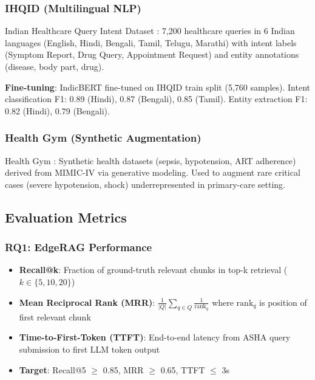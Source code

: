 \documentclass[conference,compsoc]{IEEEtran}
\begin{document}
\subsubsection{IHQID (Multilingual NLP)}
Indian Healthcare Query Intent Dataset \cite{ihqid_acl_2023}: 7,200 healthcare queries in 6 Indian languages (English, Hindi, Bengali, Tamil, Telugu, Marathi) with intent labels (Symptom Report, Drug Query, Appointment Request) and entity annotations (disease, body part, drug).

\textbf{Fine-tuning}: IndicBERT fine-tuned on IHQID train split (5,760 samples). Intent classification F1: 0.89 (Hindi), 0.87 (Bengali), 0.85 (Tamil). Entity extraction F1: 0.82 (Hindi), 0.79 (Bengali).

\subsubsection{Health Gym (Synthetic Augmentation)}
Health Gym \cite{health_gym_jmir_2024}: Synthetic health datasets (sepsis, hypotension, ART adherence) derived from MIMIC-IV via generative modeling. Used to augment rare critical cases (severe hypotension, shock) underrepresented in primary-care setting.

\subsection{Evaluation Metrics}

\subsubsection{RQ1: EdgeRAG Performance}
\begin{itemize}
    \item \textbf{Recall@k}: Fraction of ground-truth relevant chunks in top-k retrieval (\(k \in \{5, 10, 20\}\))
    \item \textbf{Mean Reciprocal Rank (MRR)}: \(\frac{1}{|Q|} \sum_{q \in Q} \frac{1}{\text{rank}_q}\) where \(\text{rank}_q\) is position of first relevant chunk
    \item \textbf{Time-to-First-Token (TTFT)}: End-to-end latency from ASHA query submission to first LLM token output
    \item \textbf{Target}: Recall@5 \(\geq\) 0.85, MRR \(\geq\) 0.65, TTFT \(\leq\) 3s
\end{itemize}
\end{document}
